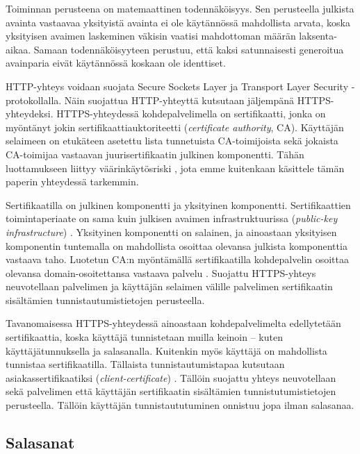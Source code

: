\documentclass{tktltiki}
\begin{document}
Toiminnan perusteena on matemaattinen todennäköisyys. Sen perusteella julkista avainta vastaavaa yksityistä avainta ei ole käytännössä mahdollista arvata, koska yksityisen avaimen laskeminen väkisin vaatisi mahdottoman määrän laksenta-aikaa. Samaan todennäköisyyteen perustuu, että kaksi satunnaisesti generoitua avainparia eivät käytännössä koskaan ole identtiset.

HTTP-yhteys voidaan suojata Secure Sockets Layer ja Transport Layer Security -protokollalla. Näin suojattua HTTP-yhteyttä kutsutaan jäljempänä HTTPS-yhteydeksi. HTTPS-yhteydessä kohdepalvelimella on sertifikaatti, jonka on myöntänyt jokin sertifikaattiauktoriteetti (\emph{certificate authority}, CA). Käyttäjän selaimeen on etukäteen asetettu lista tunnetuista CA-toimijoista sekä jokaista CA-toimijaa vastaavan juurisertifikaatin julkinen komponentti. Tähän luottamukseen liittyy väärinkäytösriski \cite{certified_lies, observatory_for_the_ssliverse}, jota emme kuitenkaan käsittele tämän paperin yhteydessä tarkemmin.

Sertifikaatilla on julkinen komponentti ja yksityinen komponentti. 
Sertifikaattien toimintaperiaate on sama kuin julkisen avaimen infrastruktuurissa (\emph{public-key infrastructure}) \cite{nist_pki_intro, henry_story_foaf_ssl}.
Yksityinen komponentti on salainen, ja ainoastaan yksityisen komponentin tuntemalla on mahdollista osoittaa olevansa julkista komponenttia vastaava taho. Luotetun CA:n myöntämällä sertifikaatilla kohdepalvelin osoittaa olevansa domain-osoitettansa vastaava palvelu \cite{authenticated_names}.
Suojattu HTTPS-yhteys neuvotellaan palvelimen ja käyttäjän selaimen välille palvelimen sertifikaatin sisältämien tunnistautumistietojen perusteella.

Tavanomaisessa HTTPS-yhteydessä ainoastaan kohdepalvelimelta edellytetään sertifikaattia, koska käyttäjä tunnistetaan muilla keinoin -- kuten käyttäjätunnuksella ja salasanalla. 
Kuitenkin myös käyttäjä on mahdollista tunnistaa sertifikaatilla. Tällaista tunnistautumistapaa kutsutaan asiakassertifikaatiksi (\emph{client-certificate}) \cite{ henry_story_foaf_ssl }.
Tällöin suojattu yhteys neuvotellaan sekä palvelimen että käyttäjän sertifikaatin sisältämien tunnistutumistietojen perusteella. 
Tällöin käyttäjän tunnistaututuminen onnistuu jopa ilman salasanaa.


\subsection{Salasanat}
 \label{sec:passwords}
 
\end{document}
